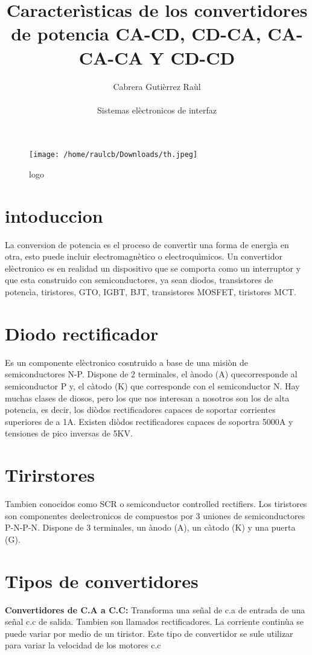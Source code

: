 \documentclass[11pt]{article}
\title{\textbf{ Caracterìsticas de los convertidores de potencia CA-CD, CD-CA, CA-CA-CA Y CD-CD}}
\author{Cabrera Gutièrrez Raùl\\
               \\
		Sistemas elèctronicos de interfaz}
\date{}
\begin{document}
\begin{figure}[htp]
\centering
\texttt{[image: /home/raulcb/Downloads/th.jpeg]}
\caption{logo}
\label{logo}
\end{figure}
\maketitle


\section{intoduccion}
La conversion de potencia es el proceso de convertìr una forma de energìa en otra, esto puede incluir electromagnètico o electroquìmicos.
Un convertidor elèctronico es en realidad un dispositivo que se comporta como un interruptor y que esta construido con semiconductores, ya sean diodos, transistores de potencìa, tiristores, GTO, IGBT, BJT, transistores MOSFET, tiristores MCT. 
\section{Diodo rectificador}
Es un componente elèctronico cosntruido a base de una misiòn de semiconductores N-P. Dispone de 2 terminales, el ànodo (A) quecorresponde al semiconductor P y, el càtodo (K) que corresponde con el semiconductor N. 
Hay muchas clases de diosos, pero los que nos interesan a nosotros son los de alta potencia, es decir, los diòdos rectificadores capaces de soportar corrientes superiores de a 1A. Existen diòdos rectificadores capaces de soportra 5000A y tensiones de pico inversas de 5KV.  
\section{Tirirstores}
Tambien conocidos como SCR o semiconductor controlled rectifiers. Los tiristores son componentes deelectronicos de compuestos por 3 uniones de semiconductores P-N-P-N. Dispone de 3 terminales, un ànodo (A), un càtodo (K) y una puerta (G).
\section{Tipos de convertidores}
\textbf{Convertidores de C.A a C.C:} Transforma una señal de c.a de entrada de una señal c.c de salida. Tambien son llamados rectificadores. La corriente continùa se puede variar por medio de un tiristor. Este tipo de convertidor se sule utilizar para variar la velocidad de los motores c.c
\end{document}
